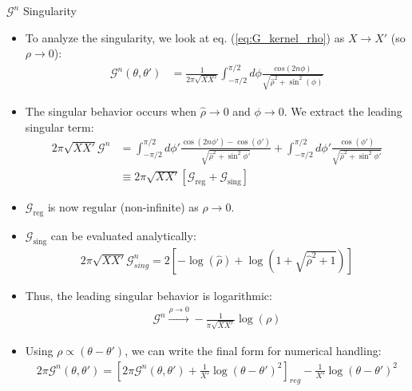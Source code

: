 \documentclass[8pt]{beamer}
\begin{document}
\begin{frame}{\color{white} $\mathcal{G}^n$ Singularity }
\begin{itemize}
    \item To analyze the singularity, we look at eq. (\ref{eq:G_kernel_rho}) as $X \to X'$ (so $\rho \to 0$):
    \begin{align}
         \mathcal{G}^n(\theta,\theta')&=\frac{1}{2\pi\sqrt{XX'}}\int_{-\pi/2}^{\pi/2} d\phi \frac{cos(2n\phi)}{\sqrt{\hat{\rho}^2+ \sin^2(\phi)}} \label{G_kernel_reg_plus_sing}
    \end{align}
    \item The singular behavior occurs when $\hat{\rho} \to 0$ and $\phi \to 0$. We extract the leading singular term:
    \begin{align}
         2\pi\sqrt{XX'}\mathcal{G}^n &= \int_{-\pi/2}^{\pi/2} d\phi' \frac{\cos(2n\phi') - \cos(\phi')}{\sqrt{\hat{\rho}^2 + \sin^2\phi'}} + \int_{-\pi/2}^{\pi/2} d\phi' \frac{\cos(\phi')}{\sqrt{\hat{\rho}^2 + \sin^2\phi'}} \label{G_kernel_sum}\\
         &\equiv 2\pi\sqrt{XX'}[\mathcal{G}_{\text{reg}} + \mathcal{G}_{\text{sing}}]
    \end{align}
    \item $\mathcal{G}_{\text{reg}}$ is now regular (non-infinite) as $\rho \to 0$.
    \item $\mathcal{G}_{\text{sing}}$ can be evaluated analytically:
    \begin{align}
         2\pi\sqrt{XX'} \mathcal{G}^n_{sing} = 2 \left[ -\log(\hat{\rho}) + \log(1+\sqrt{\hat{\rho}^2+1}) \right]
    \end{align}
    \item Thus, the leading singular behavior is logarithmic:
    \begin{align}
         \mathcal{G}^n \xrightarrow{\rho\to0} - \frac{1}{\pi \sqrt{XX'}}\log(\rho)
    \end{align}
    \item Using $\rho \propto (\theta-\theta')$, we can write the final form for numerical handling:
    \begin{align}
         2 \pi \mathcal{G}^n(\theta,\theta') = \left[ 2\pi \mathcal{G}^n(\theta,\theta') + \frac{1}{X'}\log(\theta-\theta')^2 \right]_{reg} -\frac{1}{X'}\log(\theta-\theta')^2 \label{eq:Singualr_equation}
    \end{align}
\end{itemize}
\end{frame}
\end{document}
